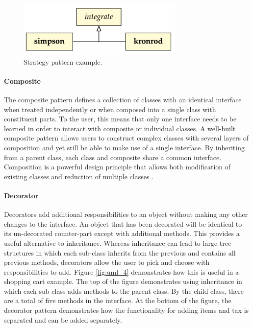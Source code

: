 \begin{figure}[h]
\centering
\includegraphics[scale=0.5]{images/uml_3}
\caption{Strategy pattern example.}
\label{fig:uml_3}
\end{figure}

\paragraph{Composite}
The composite pattern defines a collection of classes with an identical interface when treated independently or when composed into a single class with constituent parts. To the user, this means that only one interface needs to be learned in order to interact with composite or individual classes. A well-built composite pattern allows users to construct complex classes with several layers of composition and yet still be able to make use of a single interface. By inheriting from a parent class, each class and composite share a common interface. Composition is a powerful design principle that allows both modification of existing classes and reduction of multiple classes \citep{Kiraly2021}. 

\paragraph{Decorator}
Decorators add additional responsibilities to an object without making any other changes to the interface. An object that has been decorated will be identical to its un-decorated counter-part except with additional methods. This provides a useful alternative to inheritance. Whereas inheritance can lead to large tree structures in which each sub-class inherits from the previous and contains all previous methods, decorators allow the user to pick and choose with responsibilities to add. Figure \ref{fig:uml_4} demonstrates how this is useful in a shopping cart example. The top of the figure demonstrates using inheritance in which each sub-class adds methods to the  parent class. By the  child class, there are a total of five methods in the interface. At the bottom of the figure, the decorator pattern demonstrates how the functionality for adding items and tax is separated and can be added separately.


